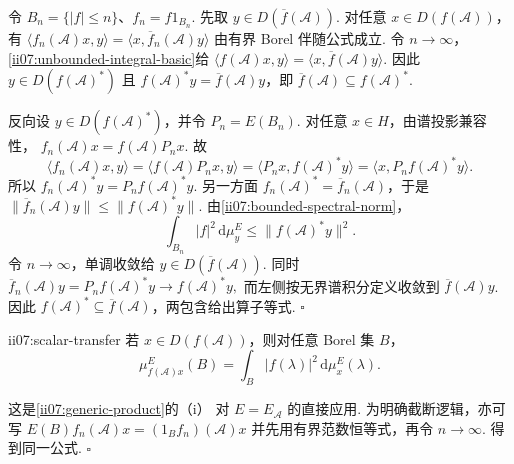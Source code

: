 \begin{FAProof}
令 \(\displaystyle B_n=\{|f|\leqslant n\}\)、\(\displaystyle f_n=f1_{B_n}\). 先取 \(\displaystyle y\in D(\overline f(\mathcal A))\). 对任意 \(\displaystyle x\in D(f(\mathcal A))\)，有
\(\displaystyle \langle f_n(\mathcal A)x,y\rangle = \langle x,\overline f_n(\mathcal A)y\rangle\)
由有界 Borel 伴随公式成立. 令 \(\displaystyle n\to\infty\)，\autoref{ii07:unbounded-integral-basic}给
\(\displaystyle \langle f(\mathcal A)x,y\rangle = \langle x,\overline f(\mathcal A)y\rangle.\)
因此 \(\displaystyle y\in D(f(\mathcal A)^*)\) 且 \(\displaystyle f(\mathcal A)^*y=\overline f(\mathcal A)y\)，即
\(\displaystyle \overline f(\mathcal A)\subseteq f(\mathcal A)^*.\)

反向设 \(\displaystyle y\in D(f(\mathcal A)^*)\)，并令 \(\displaystyle P_n=E(B_n)\). 对任意 \(\displaystyle x\in H\)，由谱投影兼容性，
\(\displaystyle f_n(\mathcal A)x=f(\mathcal A)P_nx.\)
故
\[
\langle f_n(\mathcal A)x,y\rangle=\langle f(\mathcal A)P_nx,y\rangle=\langle P_nx,f(\mathcal A)^*y\rangle=\langle x,P_nf(\mathcal A)^*y\rangle.
\]
所以
\(\displaystyle f_n(\mathcal A)^*y=P_nf(\mathcal A)^*y.\)
另一方面 \(\displaystyle f_n(\mathcal A)^*=\overline f_n(\mathcal A)\)，于是
\(\displaystyle \|\overline f_n(\mathcal A)y\| \leqslant \|f(\mathcal A)^*y\|.\)
由\autoref{ii07:bounded-spectral-norm}，
\[
\int_{B_n}|f|^2\,\mathrm{d}\mu_y^E
\leqslant
\|f(\mathcal A)^*y\|^2.
\]
令 \(\displaystyle n\to\infty\)，单调收敛给 \(\displaystyle y\in D(\overline f(\mathcal A))\). 同时
\(\displaystyle \overline f_n(\mathcal A)y =P_nf(\mathcal A)^*y \to f(\mathcal A)^*y,\)
而左侧按无界谱积分定义收敛到 \(\displaystyle\overline f(\mathcal A)y\). 因此 \(\displaystyle f(\mathcal A)^*\subseteq\overline f(\mathcal A)\)，两包含给出算子等式.
\hfill\(\square\)
\end{FAProof}

\begin{FAProposition}[C][函数演算后的标量谱测度]{ii07:scalar-transfer}
若 \(\displaystyle x\in D(f(\mathcal A))\)，则对任意 Borel 集 \(\displaystyle B\)，
\[
\mu_{f(\mathcal A)x}^{E}(B)
=
\int_B|f(\lambda)|^2\,\mathrm{d}\mu_x^E(\lambda).
\]
\end{FAProposition}

\begin{FAProof}
这是\autoref{ii07:generic-product}的（i） 对 \(\displaystyle E=E_{\mathcal A}\) 的直接应用. 为明确截断逻辑，亦可写
\(\displaystyle E(B)f_n(\mathcal A)x=(1_Bf_n)(\mathcal A)x\)
并先用有界范数恒等式，再令 \(\displaystyle n\to\infty\). 得到同一公式.
\hfill\(\square\)
\end{FAProof}


